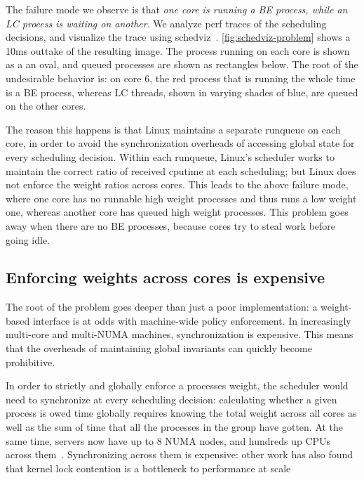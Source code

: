The failure mode we observe is that \textit{one core is running a BE process,
while an LC process is waiting on another}. We analyze perf traces of the
scheduling decisions, and visualize the trace using schedviz~\cite{TODO}.
\autoref{fig:schedviz-problem} shows a 10ms outtake of the resulting image. The
process running on each core is shown as a an oval, and queued processes are
shown as rectangles below. The root of the undesirable behavior is: on core 6,
the red process that is running the whole time is a BE process, whereas LC
threads, shown in varying shades of blue, are queued on the other cores.

The reason this happens is that Linux maintains a separate runqueue on each
core, in order to avoid the synchronization overheads of accessing global state
for every scheduling decision. Within each runqueue, Linux's scheduler works to
maintain the correct ratio of received cputime at each scheduling; but Linux
does not enforce the weight ratios across cores. This leads to the above failure
mode, where one core has no runnable high weight processes and thus runs a low
weight one, whereas another core has queued high weight processes. This problem
goes away when there are no BE processes, because cores try to steal work before
going idle.

\subsection{Enforcing weights across cores is
expensive}\label{ss:problem:cross-core-hard}

The root of the problem goes deeper than just a poor implementation: a
weight-based interface is at odds with machine-wide policy enforcement. In
increasingly multi-core and multi-NUMA machines, synchronization is expensive.
This means that the overheads of maintaining global invariants can quickly
become prohibitive.

In order to strictly and globally enforce a processes weight, the scheduler
would need to synchronize at every scheduling decision: calculating whether a
given process is owed time globally requires knowing the total weight across all
cores as well as the sum of time that all the processes in the group have
gotten. At the same time, servers now have up to 8 NUMA nodes, and hundreds up
CPUs across them~\cite{TODO}. Synchronizing across them is expensive: other work
has also found that kernel lock contention is a bottleneck to performance at
scale~\cite{TODO}


